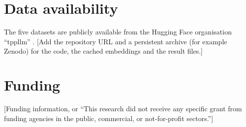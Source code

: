\documentclass[preprint,12pt,authoryear]{elsarticle}
\newcommand{\todo}[1]{{\color{red}[#1]}}
\begin{document}
\section*{Data availability}
The five datasets are publicly available from the Hugging Face organisation ``tppllm'' \citep{liu2024tppllm}. \todo{Add the repository URL and a persistent archive (for example Zenodo) for the code, the cached embeddings and the result files.}

\section*{Funding}
\todo{Funding information, or ``This research did not receive any specific grant from funding agencies in the public, commercial, or not-for-profit sectors.''}



\end{document}
